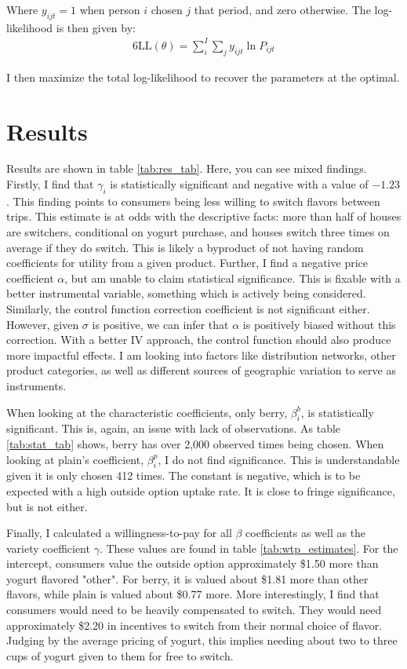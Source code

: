 \documentclass[11pt]{article}
\theoremstyle{definition}
\theoremstyle{remark}
\begin{document}
Where $y_{ijt} = 1$ when person $i$ chosen $j$ that period, and zero otherwise. The log-likelihood is then given by:
\begin{alignat*}{6}
  \text{LL}(\theta) = \sum_i^I\sum_jy_{ijt}\ln P_{ijt}
\end{alignat*}

I then maximize the total log-likelihood to recover the parameters at the optimal.

\section{Results}

Results are shown in table \ref{tab:res_tab}. Here, you can see mixed findings. Firstly, I find that $\gamma_i$ is statistically significant and negative with a value of $-1.23$. This finding points to consumers being less willing to switch flavors between trips. This estimate is at odds with the descriptive facts: more than half of houses are switchers, conditional on yogurt purchase, and houses switch three times on average if they do switch. This is likely a byproduct of not having random coefficients for utility from a given product. Further, I find a negative price coefficient $\alpha$, but am unable to claim statistical significance. This is fixable with a better instrumental variable, something which is actively being considered. Similarly, the control function correction coefficient is not significant either. However, given $\sigma$ is positive, we can infer that $\alpha$ is positively biased without this correction. With a better IV approach, the control function should also produce more impactful effects. I am looking into factors like distribution networks, other product categories, as well as different sources of geographic variation to serve as instruments.

When looking at the characteristic coefficients, only berry, $\beta_i^b$, is statistically significant. This is, again, an issue with lack of observations. As table \ref{tab:stat_tab} shows, berry has over 2,000 observed times being chosen. When looking at plain's coefficient, $\beta_i^p$, I do not find significance. This is understandable given it is only chosen 412 times. The constant is negative, which is to be expected with a high outside option uptake rate. It is close to fringe significance, but is not either. 

Finally, I calculated a willingness-to-pay for all $\beta$ coefficients as well as the variety coefficient $\gamma$. These values are found in table \ref{tab:wtp_estimates}. For the intercept, consumers value the outside option approximately \$1.50 more than yogurt flavored "other". For berry, it is valued about \$1.81 more than other flavors, while plain is valued about \$0.77 more. More interestingly, I find that consumers would need to be heavily compensated to switch. They would need approximately \$2.20 in incentives to switch from their normal choice of flavor. Judging by the average pricing of yogurt, this implies needing about two to three cups of yogurt given to them for free to switch. 
\end{document}
